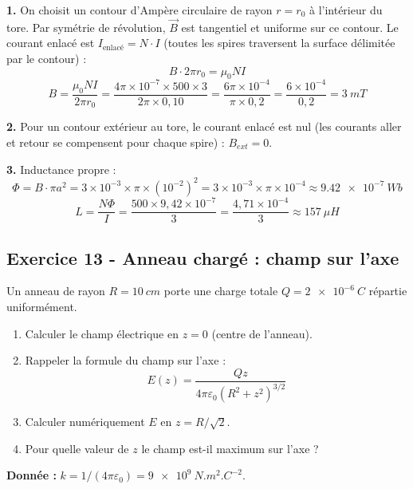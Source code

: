 \documentclass[12pt,a4paper]{article}
\begin{document}
\begin{boitecorrige}
\textbf{1.} On choisit un contour d'Ampère circulaire de rayon $r = r_0$ à l'intérieur du tore. Par symétrie de révolution, $\vec{B}$ est tangentiel et uniforme sur ce contour. Le courant enlacé est $I_{\text{enlacé}} = N\cdot I$ (toutes les spires traversent la surface délimitée par le contour) :
\[
B\cdot 2\pi r_0 = \mu_0 N I
\]
\[
B = \frac{\mu_0 N I}{2\pi r_0} = \frac{4\pi\times10^{-7}\times500\times3}{2\pi\times0{,}10} = \frac{6\pi\times10^{-4}}{\pi\times0{,}2} = \frac{6\times10^{-4}}{0{,}2} = \qty{3}{mT}
\]

\textbf{2.} Pour un contour extérieur au tore, le courant enlacé est nul (les courants aller et retour se compensent pour chaque spire) : $B_{ext} = 0$.

\textbf{3.} Inductance propre :
\[
\Phi = B\cdot\pi a^2 = 3\times10^{-3}\times\pi\times(10^{-2})^2 = 3\times10^{-3}\times\pi\times10^{-4} \approx \qty{9.42e-7}{Wb}
\]
\[
L = \frac{N\Phi}{I} = \frac{500\times9{,}42\times10^{-7}}{3} = \frac{4{,}71\times10^{-4}}{3} \approx \qty{157}{\mu H}
\]
\end{boitecorrige}


\subsection*{Exercice 13 - Anneau chargé : champ sur l'axe \niveau{\moyen}}

\begin{boiteexercice}
Un anneau de rayon $R = \qty{10}{cm}$ porte une charge totale $Q = \qty{2e-6}{C}$ répartie uniformément.
\begin{enumerate}
  \item Calculer le champ électrique en $z = 0$ (centre de l'anneau).
  \item Rappeler la formule du champ sur l'axe :
  \[
  E(z) = \frac{Qz}{4\pi\varepsilon_0(R^2+z^2)^{3/2}}
  \]
  \item Calculer numériquement $E$ en $z = R/\sqrt{2}$.
  \item Pour quelle valeur de $z$ le champ est-il maximum sur l'axe ?
\end{enumerate}
\textbf{Donnée :} $k = 1/(4\pi\varepsilon_0) = \qty{9e9}{N.m^2.C^{-2}}$.
\end{boiteexercice}
\end{document}
